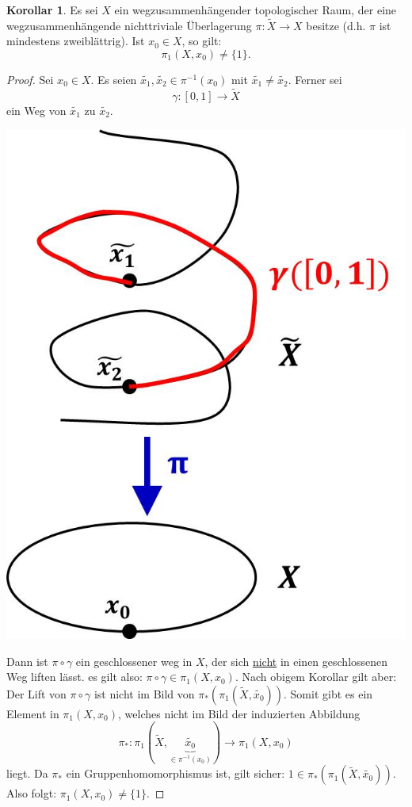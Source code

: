 \documentclass[a4paper,11pt,notitlepage]{report}
\theoremstyle{definition}
\newtheorem{corollary}{Korollar}[chapter]
\begin{document}
\begin{corollary}
	Es sei $X$ ein wegzusammenhängender topologischer Raum, der eine wegzusammenhängende nichttriviale Überlagerung $\pi \colon \widetilde{X} \rightarrow X$ besitze (d.h. $\pi$ ist mindestens zweiblättrig). Ist $x_0 \in X$, so gilt:
	$$\pi_1(X,x_0) \neq \{1\}.$$
\end{corollary}

\begin{proof}
	Sei $x_0 \in X$. Es seien $\widetilde{x_1}, \widetilde{x_2} \in \pi^{-1}(x_0)$ mit $\widetilde{x_1} \neq \widetilde{x_2}$. Ferner sei
	$$\gamma \colon [0,1] \rightarrow \widetilde{X}$$ ein Weg von $\widetilde{x_1}$ zu $\widetilde{x_2}$.
	
\begin{center}
	\includegraphics[scale=0.5]{images/2011_12_19_Bild3.jpg}
\end{center}
	Dann ist $\pi \circ \gamma$ ein geschlossener weg in $X$, der sich \underline{nicht} in einen geschlossenen Weg liften lässt. es gilt also: $\pi \circ \gamma \in \pi_1(X,x_0)$. Nach obigem Korollar gilt aber: Der Lift von $\pi \circ \gamma$ ist nicht im Bild von $\pi_*(\pi_1(\widetilde{X}, \widetilde{x_0}))$. Somit gibt es ein Element in $\pi_1(X,x_0)$, welches nicht im Bild der induzierten Abbildung 
	$$\pi_* \colon \pi_1(\widetilde{X}, \underbrace{\widetilde{x_0}}_{\in \pi^{-1}(x_0)}) \rightarrow \pi_1(X,x_0)$$ liegt.
	\newline
	Da $\pi_*$ ein Gruppenhomomorphismus ist, gilt sicher: $1 \in \pi_*(\pi_1(\widetilde{X},\widetilde{x_0}))$.
	\newline
	Also folgt: $\pi_1(X,x_0) \neq \{1\}$.
\end{proof}
\end{document}
